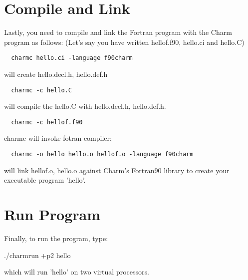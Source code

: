\documentclass[11pt]{article}
\begin{document}
\section{Compile and Link}
Lastly, you need to compile and link the Fortran program with the
Charm program as follows: (Let's say you have written hellof.f90, 
hello.ci and hello.C)
\begin{verbatim}
  charmc hello.ci -language f90charm
\end{verbatim}
    will create hello.decl.h, hello.def.h

\begin{verbatim}
  charmc -c hello.C
\end{verbatim}
    will compile the hello.C with hello.decl.h, hello.def.h.

\begin{verbatim}
  charmc -c hellof.f90
\end{verbatim}
    charmc will invoke fotran compiler;

\begin{verbatim}
  charmc -o hello hello.o hellof.o -language f90charm
\end{verbatim}
    will link hellof.o, hello.o against Charm's Fortran90 library
    to create your executable program 'hello'.

\section{Run Program}

Finally, to run the program, type:

./charmrun +p2 hello

which will run 'hello' on two virtual processors.
\end{document}
